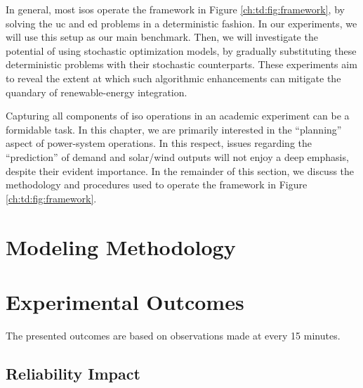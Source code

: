 In general, most \glspl{iso} operate the framework in Figure \ref{ch:td:fig:framework}, by solving the \gls{uc} and \gls{ed} problems in a deterministic fashion. In our experiments, we will use this setup as our main benchmark. Then, we will investigate the potential of using stochastic optimization models, by gradually substituting these deterministic problems with their stochastic counterparts. These experiments aim to reveal the extent at which such algorithmic enhancements can mitigate the quandary of renewable-energy integration. 

Capturing all components of \gls{iso} operations in an academic experiment can be a formidable task. In this chapter, we are primarily interested in the ``planning'' aspect of power-system operations. In this respect, issues regarding the ``prediction'' of demand and solar/wind outputs will not enjoy a deep emphasis, despite their evident importance. In the remainder of this section, we discuss the methodology and procedures used to operate the framework in Figure \ref{ch:td:fig:framework}.


\section{Modeling Methodology}

\section{Experimental Outcomes}

The presented outcomes are based on observations made at every 15 minutes.

\subsection{Reliability Impact}

